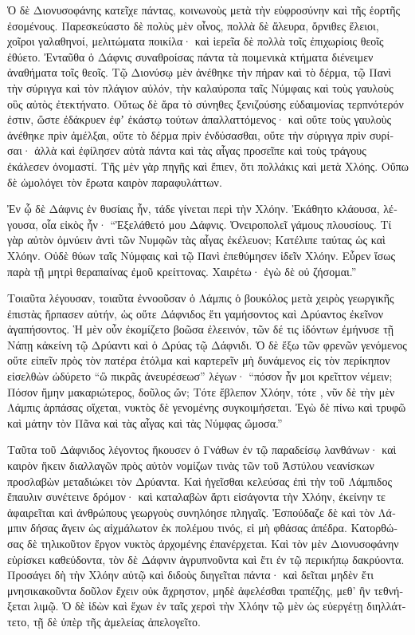 \documentclass{book}
\begin{document}
\begin{pairs}
\begin{Leftside}
\begin{greek}
  Ὁ δὲ Διονυσοφάνης κατεῖχε πάντας, κοινωνοὺς μετὰ τὴν εὐφροσύνην καὶ τῆς ἑορτῆς ἐσομένους. Παρεσκεύαστο δὲ πολὺς μὲν οἶνος, πολλὰ δὲ ἄλευρα, ὄρνιθες ἕλειοι, χοῖροι γαλαθηνοί, μελιτώματα ποικίλα· καὶ ἱερεῖα δὲ πολλὰ τοῖς ἐπιχωρίοις θεοῖς ἐθύετο.  Ἐνταῦθα ὁ Δάφνις συναθροίσας πάντα τὰ ποιμενικὰ κτήματα διένειμεν ἀναθήματα τοῖς θεοῖς. Τῷ Διονύσῳ μὲν ἀνέθηκε τὴν πήραν καὶ τὸ δέρμα, τῷ Πανὶ τὴν σύριγγα καὶ τὸν πλάγιον αὐλόν, τὴν καλαύροπα ταῖς Νύμφαις καὶ τοὺς γαυλοὺς οὓς αὐτὸς ἐτεκτήνατο.  Οὕτως δὲ ἄρα τὸ σύνηθες ξενιζούσης εὐδαιμονίας τερπνότερόν ἐστιν, ὥστε ἐδάκρυεν ἐφʼ ἑκάστῳ τούτων ἀπαλλαττόμενος· καὶ οὔτε τοὺς γαυλοὺς ἀνέθηκε πρὶν ἀμέλξαι, οὔτε τὸ δέρμα πρὶν ἐνδύσασθαι, οὔτε τὴν σύριγγα πρὶν συρίσαι·  ἀλλὰ καὶ ἐφίλησεν αὐτὰ πάντα καὶ τὰς αἶγας προσεῖπε καὶ τοὺς τράγους ἐκάλεσεν ὀνομαστί. Τῆς μὲν γὰρ πηγῆς καὶ ἔπιεν, ὅτι πολλάκις καὶ μετὰ Χλόης. Οὔπω δὲ ὡμολόγει τὸν ἔρωτα καιρὸν παραφυλάττων.
\pend


  Ἐν ᾧ δὲ Δάφνις ἐν θυσίαις ἦν, τάδε γίνεται περὶ τὴν Χλόην. Ἐκάθητο κλάουσα, λέγουσα, οἷα εἰκὸς ἦν· “Ἐξελάθετό μου Δάφνις. Ὀνειροπολεῖ γάμους πλουσίους.  Τί γὰρ αὐτὸν ὀμνύειν ἀντὶ τῶν Νυμφῶν τὰς αἶγας ἐκέλευον; Κατέλιπε ταύτας ὡς καὶ Χλόην. Οὐδὲ θύων ταῖς Νύμφαις καὶ τῷ Πανὶ ἐπεθύμησεν ἰδεῖν Χλόην. Εὗρεν ἴσως παρὰ τῇ μητρὶ θεραπαίνας ἐμοῦ κρείττονας. Χαιρέτω· ἐγὼ δὲ οὐ ζήσομαι.”
\pend


  Τοιαῦτα λέγουσαν, τοιαῦτα ἐννοοῦσαν ὁ Λάμπις ὁ βουκόλος μετὰ χειρὸς γεωργικῆς ἐπιστὰς ἥρπασεν αὐτήν, ὡς οὔτε Δάφνιδος ἔτι γαμήσοντος καὶ Δρύαντος ἐκεῖνον ἀγαπήσοντος. Ἡ μὲν οὖν ἐκομίζετο βοῶσα ἐλεεινόν, τῶν δέ τις ἰδόντων ἐμήνυσε τῇ Νάπῃ κἀκείνη τῷ Δρύαντι καὶ ὁ Δρύας τῷ Δάφνιδι.  Ὁ δὲ ἔξω τῶν φρενῶν γενόμενος οὔτε εἰπεῖν πρὸς τὸν πατέρα ἐτόλμα καὶ καρτερεῖν μὴ δυνάμενος εἰς τὸν περίκηπον εἰσελθὼν ὠδύρετο “ὢ πικρᾶς ἀνευρέσεωσ”  λέγων· “πόσον ἦν μοι κρεῖττον νέμειν; Πόσον ἤμην μακαριώτερος, δοῦλος ὤν; Τότε ἔβλεπον Χλόην, τότε , νῦν δὲ τὴν μὲν Λάμπις ἁρπάσας οἴχεται, νυκτὸς δὲ γενομένης συγκοιμήσεται. Ἐγὼ δὲ πίνω καὶ τρυφῶ καὶ μάτην τὸν Πᾶνα καὶ τὰς αἶγας καὶ τὰς Νύμφας ὤμοσα.”
\pend


  Ταῦτα τοῦ Δάφνιδος λέγοντος ἤκουσεν ὁ Γνάθων ἐν τῷ παραδείσῳ λανθάνων· καὶ καιρὸν ἥκειν διαλλαγῶν πρὸς αὐτὸν νομίζων τινὰς τῶν τοῦ Ἀστύλου νεανίσκων προσλαβὼν μεταδιώκει τὸν Δρύαντα.  Καὶ ἡγεῖσθαι κελεύσας ἐπὶ τὴν τοῦ Λάμπιδος ἔπαυλιν συνέτεινε δρόμον· καὶ καταλαβὼν ἄρτι εἰσάγοντα τὴν Χλόην, ἐκείνην τε ἀφαιρεῖται καὶ ἀνθρώπους γεωργοὺς συνηλόησε πληγαῖς.  Ἐσπούδαζε δὲ καὶ τὸν Λάμπιν δήσας ἄγειν ὡς αἰχμάλωτον ἐκ πολέμου τινός, εἰ μὴ φθάσας ἀπέδρα. Κατορθώσας δὲ τηλικοῦτον ἔργον νυκτὸς ἀρχομένης ἐπανέρχεται.  Καὶ τὸν μὲν Διονυσοφάνην εὑρίσκει καθεύδοντα, τὸν δὲ Δάφνιν ἀγρυπνοῦντα καὶ ἔτι ἐν τῷ περικήπῳ δακρύοντα. Προσάγει δὴ τὴν Χλόην αὐτῷ καὶ διδοὺς διηγεῖται πάντα· καὶ δεῖται μηδὲν ἔτι μνησικακοῦντα δοῦλον ἔχειν οὐκ ἄχρηστον, μηδὲ ἀφελέσθαι τραπέζης, μεθ’ ἣν τεθνήξεται λιμῷ.  Ὁ δὲ ἰδὼν καὶ ἔχων ἐν ταῖς χερσὶ τὴν Χλόην τῷ μὲν ὡς εὐεργέτῃ διηλλάττετο, τῇ δὲ ὑπὲρ τῆς ἀμελείας ἀπελογεῖτο.
\pend



\end{greek}
\end{Leftside}
\end{pairs}
\end{document}
